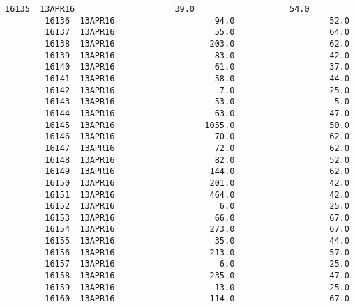 \documentclass[11pt]{article}
\begin{document}
\begin{Verbatim}[commandchars=\\\{\}]
        16135  13APR16                    39.0                   54.0   
        16136  13APR16                    94.0                   52.0   
        16137  13APR16                    55.0                   64.0   
        16138  13APR16                   203.0                   62.0   
        16139  13APR16                    83.0                   42.0   
        16140  13APR16                    61.0                   37.0   
        16141  13APR16                    58.0                   44.0   
        16142  13APR16                     7.0                   25.0   
        16143  13APR16                    53.0                    5.0   
        16144  13APR16                    63.0                   47.0   
        16145  13APR16                  1055.0                   50.0   
        16146  13APR16                    70.0                   62.0   
        16147  13APR16                    72.0                   62.0   
        16148  13APR16                    82.0                   52.0   
        16149  13APR16                   144.0                   62.0   
        16150  13APR16                   201.0                   42.0   
        16151  13APR16                   464.0                   42.0   
        16152  13APR16                     6.0                   25.0   
        16153  13APR16                    66.0                   67.0   
        16154  13APR16                   273.0                   67.0   
        16155  13APR16                    35.0                   44.0   
        16156  13APR16                   213.0                   57.0   
        16157  13APR16                     6.0                   25.0   
        16158  13APR16                   235.0                   47.0   
        16159  13APR16                    13.0                   25.0   
        16160  13APR16                   114.0                   67.0   
        

\end{Verbatim}
\end{document}
